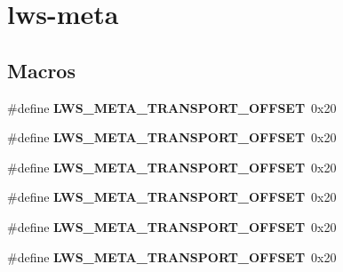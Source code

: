 \hypertarget{group__lwsmeta}{}\section{lws-\/meta}
\label{group__lwsmeta}
\subsection*{Macros}
\begin{DoxyCompactItemize}
\item 
\mbox{\label{group__lwsmeta_ga0190ba22d315192e8a38501645f288ea}} 
\#define {\bfseries L\+W\+S\+\_\+\+M\+E\+T\+A\+\_\+\+T\+R\+A\+N\+S\+P\+O\+R\+T\+\_\+\+O\+F\+F\+S\+ET}~0x20
\item 
\mbox{\label{group__lwsmeta_ga0190ba22d315192e8a38501645f288ea}} 
\#define {\bfseries L\+W\+S\+\_\+\+M\+E\+T\+A\+\_\+\+T\+R\+A\+N\+S\+P\+O\+R\+T\+\_\+\+O\+F\+F\+S\+ET}~0x20
\item 
\mbox{\label{group__lwsmeta_ga0190ba22d315192e8a38501645f288ea}} 
\#define {\bfseries L\+W\+S\+\_\+\+M\+E\+T\+A\+\_\+\+T\+R\+A\+N\+S\+P\+O\+R\+T\+\_\+\+O\+F\+F\+S\+ET}~0x20
\item 
\mbox{\label{group__lwsmeta_ga0190ba22d315192e8a38501645f288ea}} 
\#define {\bfseries L\+W\+S\+\_\+\+M\+E\+T\+A\+\_\+\+T\+R\+A\+N\+S\+P\+O\+R\+T\+\_\+\+O\+F\+F\+S\+ET}~0x20
\item 
\mbox{\label{group__lwsmeta_ga0190ba22d315192e8a38501645f288ea}} 
\#define {\bfseries L\+W\+S\+\_\+\+M\+E\+T\+A\+\_\+\+T\+R\+A\+N\+S\+P\+O\+R\+T\+\_\+\+O\+F\+F\+S\+ET}~0x20
\item 
\mbox{\label{group__lwsmeta_ga0190ba22d315192e8a38501645f288ea}} 
\#define {\bfseries L\+W\+S\+\_\+\+M\+E\+T\+A\+\_\+\+T\+R\+A\+N\+S\+P\+O\+R\+T\+\_\+\+O\+F\+F\+S\+ET}~0x20
\end{DoxyCompactItemize}
